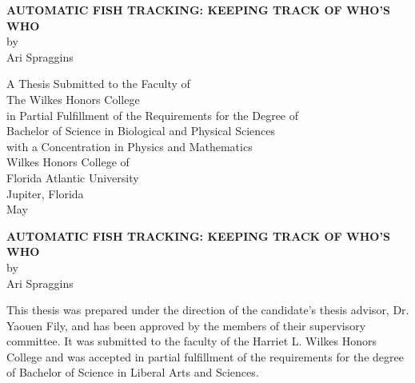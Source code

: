\documentclass{article}
\begin{document}

\newcommand{\mytitle}{Automatic Fish Tracking: 
Keeping Track of Who’s Who}
\newcommand{\myauthor}{Ari Spraggins}

\newcommand{\myskip}{\vspace{0.5in}}
\newcommand{\layouttitle}[1]{{\bf\large\MakeUppercase{#1}}}
\setlength{\parindent}{0em}
\doublespace
{}
\thispagestyle{empty}

\begin{center}

	\vspace{4in} 
	\layouttitle{\mytitle} \\ by \\ \myauthor
	
	\vspace{1in}
	A Thesis Submitted to the Faculty of \\
	The Wilkes Honors College \\
	in Partial Fulfillment of the Requirements for the Degree of \\
	Bachelor of Science in Biological and Physical Sciences \\
	with a Concentration in Physics and Mathematics \\ 
	\vspace{1in} 
	Wilkes Honors College of \\
	Florida Atlantic University \\
	Jupiter, Florida \\
	May \number\year

\end{center}

\newpage


\vspace{4in}
\begin{center}
	\layouttitle{\mytitle} \\
	by \\
	\myauthor
\end{center}

\singlespace
\vspace{1in}
This thesis was prepared under the direction of the candidate's thesis advisor, Dr. Yaouen Fily, and has been approved by the members of their supervisory committee. It was submitted to the faculty of the Harriet L. Wilkes Honors College and was accepted in partial fulfillment of the requirements for the degree of Bachelor of Science in Liberal Arts and Sciences.
\end{document}
